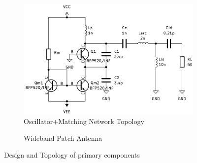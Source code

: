 \begin{figure}[h]
    \centering
    \begin{subfigure}[t]{0.64\textwidth}
        \centering
        \includegraphics[width=\linewidth]{images/osc/osc_circuit.png}
        \caption{Oscillator+Matching Network Topology}
        \label{fig:osc_and_match}
    \end{subfigure}
    \hfill
    \begin{subfigure}[t]{0.35\textwidth}
        \centering
        \caption{Wideband Patch Antenna}
        \label{fig:patch-antenna}
    \end{subfigure}
    \caption{Design and Topology of primary components}
    \label{fig:combined}
\end{figure}


